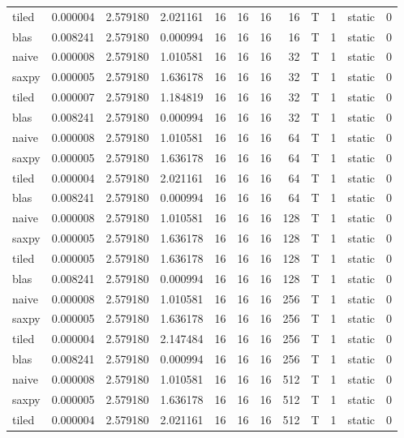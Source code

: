 \documentclass[
  12pt,
  xcolor = usenames,dvipsnames]{article}
\begin{document}
\begin{table}[!h]
{\begin{tabular}[t]{lrrrrrrrlrlr}
tiled & 0.000004 & 2.579180 & 2.021161 & 16 & 16 & 16 & 16 & T & 1 & static & 0\\
blas & 0.008241 & 2.579180 & 0.000994 & 16 & 16 & 16 & 16 & T & 1 & static & 0\\
naive & 0.000008 & 2.579180 & 1.010581 & 16 & 16 & 16 & 32 & T & 1 & static & 0\\
saxpy & 0.000005 & 2.579180 & 1.636178 & 16 & 16 & 16 & 32 & T & 1 & static & 0\\
tiled & 0.000007 & 2.579180 & 1.184819 & 16 & 16 & 16 & 32 & T & 1 & static & 0\\
\addlinespace
blas & 0.008241 & 2.579180 & 0.000994 & 16 & 16 & 16 & 32 & T & 1 & static & 0\\
naive & 0.000008 & 2.579180 & 1.010581 & 16 & 16 & 16 & 64 & T & 1 & static & 0\\
saxpy & 0.000005 & 2.579180 & 1.636178 & 16 & 16 & 16 & 64 & T & 1 & static & 0\\
tiled & 0.000004 & 2.579180 & 2.021161 & 16 & 16 & 16 & 64 & T & 1 & static & 0\\
blas & 0.008241 & 2.579180 & 0.000994 & 16 & 16 & 16 & 64 & T & 1 & static & 0\\
\addlinespace
naive & 0.000008 & 2.579180 & 1.010581 & 16 & 16 & 16 & 128 & T & 1 & static & 0\\
saxpy & 0.000005 & 2.579180 & 1.636178 & 16 & 16 & 16 & 128 & T & 1 & static & 0\\
tiled & 0.000005 & 2.579180 & 1.636178 & 16 & 16 & 16 & 128 & T & 1 & static & 0\\
blas & 0.008241 & 2.579180 & 0.000994 & 16 & 16 & 16 & 128 & T & 1 & static & 0\\
naive & 0.000008 & 2.579180 & 1.010581 & 16 & 16 & 16 & 256 & T & 1 & static & 0\\
\addlinespace
saxpy & 0.000005 & 2.579180 & 1.636178 & 16 & 16 & 16 & 256 & T & 1 & static & 0\\
tiled & 0.000004 & 2.579180 & 2.147484 & 16 & 16 & 16 & 256 & T & 1 & static & 0\\
blas & 0.008241 & 2.579180 & 0.000994 & 16 & 16 & 16 & 256 & T & 1 & static & 0\\
naive & 0.000008 & 2.579180 & 1.010581 & 16 & 16 & 16 & 512 & T & 1 & static & 0\\
saxpy & 0.000005 & 2.579180 & 1.636178 & 16 & 16 & 16 & 512 & T & 1 & static & 0\\
\addlinespace
tiled & 0.000004 & 2.579180 & 2.021161 & 16 & 16 & 16 & 512 & T & 1 & static & 0\\

\end{tabular}}
\end{table}
\end{document}
